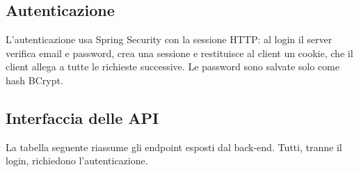 \subsection{Autenticazione}
L'autenticazione usa Spring Security con la sessione HTTP: al login il server verifica email e password, crea una sessione e restituisce al client un cookie, che il client allega a tutte le richieste successive. Le password sono salvate solo come hash BCrypt. \\


\subsection{Interfaccia delle API}
La tabella seguente riassume gli endpoint esposti dal back-end. Tutti, tranne il login, richiedono l'autenticazione.

